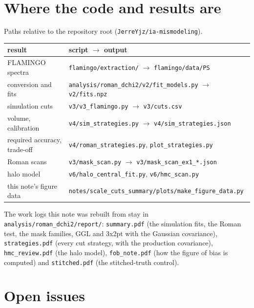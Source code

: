 \documentclass[11pt]{article}
\begin{document}
\section{Where the code and results are}
\label{app:code}

Paths relative to the repository root (\texttt{JerreYjz/ia-mismodeling}).

\begin{center}
  \small
  \begin{tabular}{ll}
    \toprule
    result & script $\rightarrow$ output \\
    \midrule
    FLAMINGO spectra & \texttt{flamingo/extraction/} $\rightarrow$ \texttt{flamingo/data/PS} \\
    conversion and fits & \texttt{analysis/roman\_dchi2/v2/fit\_models.py} $\rightarrow$ \texttt{v2/fits.npz} \\
    simulation cuts & \texttt{v3/v3\_flamingo.py} $\rightarrow$ \texttt{v3/cuts.csv} \\
    volume, calibration & \texttt{v4/sim\_strategies.py} $\rightarrow$ \texttt{v4/sim\_strategies.json} \\
    required accuracy, trade-off & \texttt{v4/roman\_strategies.py}, \texttt{plot\_strategies.py} \\
    Roman scans & \texttt{v3/mask\_scan.py} $\rightarrow$ \texttt{v3/mask\_scan\_ex1\_*.json} \\
    halo model & \texttt{v6/halo\_central\_fit.py}, \texttt{v6/hmc\_scan.py} \\
    this note's figure data & \texttt{notes/scale\_cuts\_summary/plots/make\_figure\_data.py} \\
    \bottomrule
  \end{tabular}
\end{center}

The work logs this note was rebuilt from stay in
\texttt{analysis/roman\_dchi2/report/}: \texttt{summary.pdf} (the
simulation fits, the Roman test, the mask families, GGL and 3x2pt with
the Gaussian covariance), \texttt{strategies.pdf} (every cut strategy,
with the production covariance), \texttt{hmc\_review.pdf} (the halo
model), \texttt{fob\_note.pdf} (how the figure of bias is computed) and
\texttt{stitched.pdf} (the stitched-truth control).

\section{Open issues}
\label{app:open}
\end{document}
